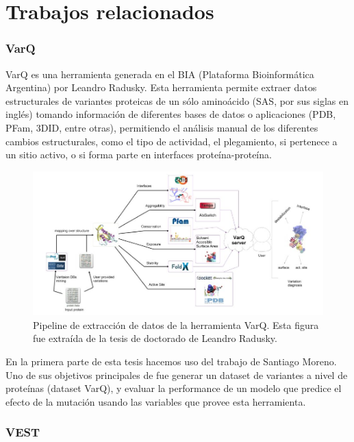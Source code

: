 \section{Trabajos relacionados}

\subsubsection{VarQ \cite{Radusky2017}}

VarQ es una herramienta generada en el BIA (Plataforma Bioinformática Argentina) por Leandro Radusky. Esta herramienta permite extraer datos estructurales de variantes proteicas de un sólo aminoácido (SAS, por sus siglas en inglés) tomando información de diferentes bases de datos o aplicaciones (PDB, PFam, 3DID, entre otras), permitiendo el análisis manual de los diferentes cambios estructurales, como el tipo de actividad, el plegamiento, si pertenece a un sitio activo, o si forma parte en interfaces proteína-proteína. 

\begin{figure}[H]
    \centering
    \includegraphics[scale=0.45]{documents/latex/figures/1/pipeline.png}
    \caption{Pipeline de extracción de datos de la herramienta VarQ. Esta figura fue extraída de la tesis de doctorado de Leandro Radusky.}
    \label{fig:varq_pipeline}
\end{figure}

En la primera parte de esta tesis hacemos uso del trabajo de Santiago Moreno. Uno de sus objetivos principales de fue generar un dataset de variantes a nivel de proteínas (dataset VarQ), y evaluar la performance de un modelo que predice el efecto de la mutación usando las variables que provee esta herramienta. 

\subsubsection{VEST \cite{Carter2013}}

